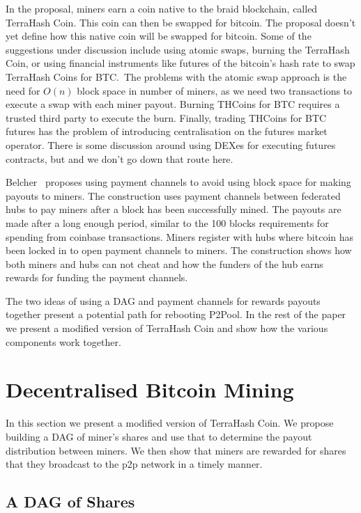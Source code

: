 \documentclass{article}
\begin{document}
In the proposal, miners earn a coin native to the braid blockchain,
called TerraHash Coin. This coin can then be swapped for bitcoin. The
proposal doesn't yet define how this native coin will be swapped for
bitcoin. Some of the suggestions under discussion include using atomic
swaps, burning the TerraHash Coin, or using financial instruments like
futures of the bitcoin's hash rate to swap TerraHash Coins for BTC.\
The problems with the atomic swap approach is the need for $O(n)$
block space in number of miners, as we need two transactions to
execute a swap with each miner payout. Burning THCoins for BTC
requires a trusted third party to execute the burn. Finally, trading
THCoins for BTC futures has the problem of introducing centralisation
on the futures market operator. There is some discussion around using
DEXes for executing futures contracts, but and we don't go down that
route here.

Belcher~\cite{channels-for-rewards} proposes using payment channels to
avoid using block space for making payouts to miners. The construction
uses payment channels between federated hubs to pay miners after a
block has been successfully mined. The payouts are made after a long
enough period, similar to the 100 blocks requirements for spending
from coinbase transactions. Miners register with hubs where bitcoin
has been locked in to open payment channels to miners. The
construction shows how both miners and hubs can not cheat and how the
funders of the hub earns rewards for funding the payment channels.

The two ideas of using a DAG and payment channels for rewards
payouts together present a potential path for rebooting P2Pool. In the
rest of the paper we present a modified version of TerraHash Coin and
show how the various components work together.

\section{Decentralised Bitcoin Mining}

In this section we present a modified version of TerraHash Coin. We
propose building a DAG of miner's shares and use that to determine the
payout distribution between miners. We then show that miners are
rewarded for shares that they broadcast to the p2p network in a timely
manner.

\subsection{A DAG of Shares}
\end{document}
